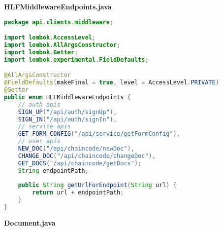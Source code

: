 \textbf{HLFMiddlewareEndpoints.java}
\begin{lstlisting}[language=Java]
package api.clients.middleware;

import lombok.AccessLevel;
import lombok.AllArgsConstructor;
import lombok.Getter;
import lombok.experimental.FieldDefaults;

@AllArgsConstructor
@FieldDefaults(makeFinal = true, level = AccessLevel.PRIVATE)
@Getter
public enum HLFMiddlewareEndpoints {
	// auth apis
	SIGN_UP("/api/auth/signUp"),
	SIGN_IN("/api/auth/signIn"),
	// service apis
	GET_FORM_CONFIG("/api/service/getFormConfig"),
	// user apis
	NEW_DOC("/api/chaincode/newDoc"),
	CHANGE_DOC("/api/chaincode/changeDoc"),
	GET_DOCS("/api/chaincode/getDocs");
	String endpointPath;
	
	public String getUrlForEndpoint(String url) {
		return url + endpointPath;
	}
}

\end{lstlisting}
\textbf{Document.java}
